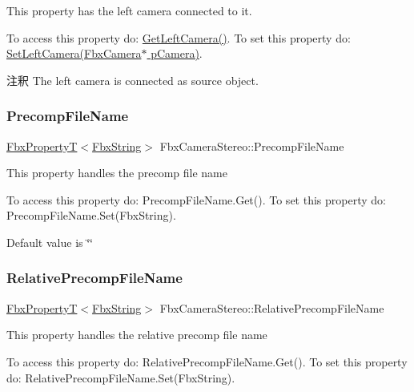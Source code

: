 This property has the left camera connected to it.

To access this property do\+: \hyperlink{class_fbx_camera_stereo_a6841f71c09bdd63c7e936cdb23e818e9}{Get\+Left\+Camera()}. To set this property do\+: \hyperlink{class_fbx_camera_stereo_a3f6d9d09dd4ec6f9fe1b1b829f26a11f}{Set\+Left\+Camera(\+Fbx\+Camera$\ast$ p\+Camera)}.

\begin{DoxyRemark}{注釈}
The left camera is connected as source object. 
\end{DoxyRemark}
\mbox{\label{class_fbx_camera_stereo_a25294714b9dfedce9180102396ebd7bc}} 
\subsubsection{\texorpdfstring{Precomp\+File\+Name}{PrecompFileName}}
{\footnotesize\ttfamily \hyperlink{class_fbx_property_t}{Fbx\+PropertyT}$<$\hyperlink{class_fbx_string}{Fbx\+String}$>$ Fbx\+Camera\+Stereo\+::\+Precomp\+File\+Name}

This property handles the precomp file name

To access this property do\+: Precomp\+File\+Name.\+Get(). To set this property do\+: Precomp\+File\+Name.\+Set(\+Fbx\+String).

Default value is \char`\"{}\char`\"{} \mbox{\label{class_fbx_camera_stereo_af7d8b1be43665a8662630cdc2fdb0dbb}} 
\subsubsection{\texorpdfstring{Relative\+Precomp\+File\+Name}{RelativePrecompFileName}}
{\footnotesize\ttfamily \hyperlink{class_fbx_property_t}{Fbx\+PropertyT}$<$\hyperlink{class_fbx_string}{Fbx\+String}$>$ Fbx\+Camera\+Stereo\+::\+Relative\+Precomp\+File\+Name}

This property handles the relative precomp file name

To access this property do\+: Relative\+Precomp\+File\+Name.\+Get(). To set this property do\+: Relative\+Precomp\+File\+Name.\+Set(\+Fbx\+String).

